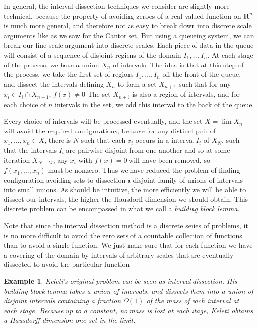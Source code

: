 \documentclass{report}
\theoremstyle{plain}
\newtheorem*{example}{Example}
\theoremstyle{plain}
\begin{document}
In general, the interval dissection techniques we consider are slightly more technical, because the property of avoiding zeroes of a real valued function on $\mathbf{R}^n$ is much more general, and therefore not as easy to break down into discrete scale arguments like as we saw for the Cantor set. But using a queueing system, we can break our fine scale argument into discrete scales. Each piece of data in the queue will consist of a sequence of disjoint regions of the domain $I_1, \dots, I_n$. At each stage of the process, we have a union $X_n$ of intervals. The idea is that at this step of the process, we take the first set of regions $I_1, \dots, I_n$ off the front of the queue, and dissect the intervals defining $X_n$ to form a set $X_{n+1}$ such that for any $x_i \in I_i \cap X_{n+1}$, $f(x) \neq 0$ The set $X_{n+1}$ is also a region of intervals, and for each choice of $n$ intervals in the set, we add this interval to the back of the queue.


Every choice of intervals will be processed eventually, and the set $X = \lim X_n$ will avoid the required configurations, because for any distinct pair of $x_1, \dots, x_n \in X$, there is $N$ such that each $x_i$ occurs in a interval $I_i$ of $X_N$, such that the intervals $I_i$ are pairwise disjoint from one another and so at some iteration $X_{N+M}$, any $x_i$ with $f(x) = 0$ will have been removed, so $f(x_1, \dots, x_n)$ must be nonzero. Thus we have reduced the problem of finding configuration avoiding sets to dissection a disjoint family of unions of intervals into small unions. As should be intuitive, the more efficiently we will be able to dissect our intervals, the higher the Hausdorff dimension we should obtain. This discrete problem can be encompassed in what we call a {\it building block lemma}.

Note that since the interval dissection method is a discrete series of problems, it is no more difficult to avoid the zero sets of a countable collection of functions than to avoid a single function. We just make sure that for each function we have a covering of the domain by intervals of arbitrary scales that are eventually dissected to avoid the particular function.

\begin{example}
    Keleti's original problem can be seen as interval dissection. His building block lemma takes a union of intervals, and dissects them into a union of disjoint intervals containing a fraction $\Omega(1)$ of the mass of each interval at each stage. Because up to a constant, no mass is lost at each stage, Keleti obtains a Hausdorff dimension one set in the limit.
\end{example}
\end{document}
